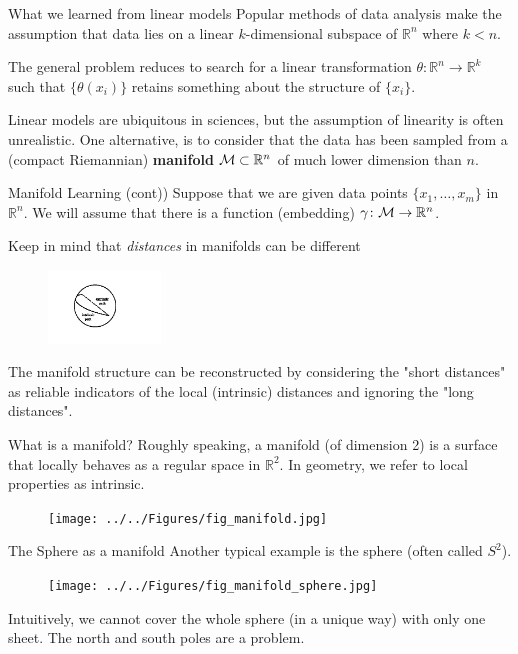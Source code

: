 \documentclass{beamer}
\begin{document}
	
\begin{frame}{What we learned from linear models}
	Popular methods of data analysis make the assumption that  data lies on a linear $k$-dimensional subspace of $\mathbb{R}^n$ where $k< n$. 
	
	The general problem reduces to search for a linear transformation $\theta \colon \mathbb{R}^n \to \mathbb{R}^k$ such that $\{\theta(x_i)\}$ retains something about the structure of $\{x_i\}$. 
	
	Linear models are ubiquitous in sciences, but the assumption of linearity is often unrealistic. One alternative, is to consider that the data has been sampled from a (compact Riemannian) \textbf{manifold} ${\cal M}\subset \mathbb{R}^n$ of much lower dimension than $n$. 

\end{frame}

\begin{frame}{Manifold Learning (cont))}
	Suppose that we are given data points $\{x_1, \ldots, x_m\}$ in $\mathbb{R}^n$. We will assume that there is a function (embedding) $\gamma \colon {\cal M} \to \mathbb{R}^n$. 
	
	Keep in mind that \textit{distances} in manifolds can be different
	\begin{figure}[h]
		\centering
		\includegraphics[width=3cm]{../../Figures/fig_geodesic.jpg}
	\end{figure}
	The manifold structure can be reconstructed by considering the "short distances" as reliable indicators of the local (intrinsic) distances and ignoring the "long distances".
	
	
\end{frame}


\begin{frame}{What is a manifold?}
	Roughly speaking, a manifold (of dimension 2) is a surface that locally behaves as a regular space in $\mathbb{R}^2$. In geometry, we refer to local properties as intrinsic. 
\begin{figure}[h]
	\centering
	\texttt{[image: ../../Figures/fig\_manifold.jpg]}
\end{figure}	
		
\end{frame}

\begin{frame}{The Sphere as a manifold}
	Another typical example is the sphere (often called $S^2$).
	
\begin{figure}[h]
	\centering
	\texttt{[image: ../../Figures/fig\_manifold\_sphere.jpg]}
\end{figure}	
Intuitively, we cannot cover the whole sphere (in a unique way) with only one sheet. The north and south poles are a problem. 

\end{frame}
\end{document}
